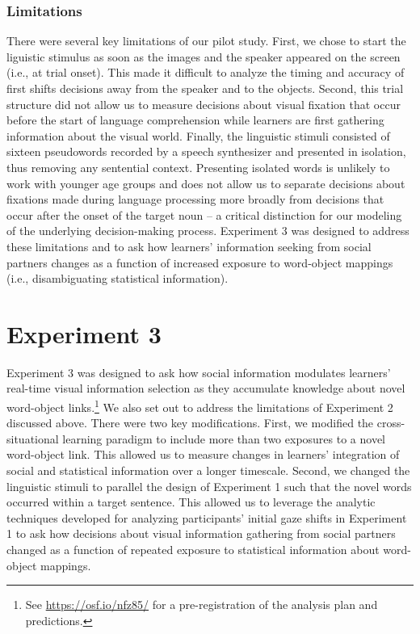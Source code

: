 \documentclass[man,floatsintext]{apa6}
\let\rmarkdownfootnote\footnote%
\def\footnote{\protect\rmarkdownfootnote}
\begin{document}
\subsubsection{Limitations}\label{limitations}

There were several key limitations of our pilot study. First, we chose
to start the liguistic stimulus as soon as the images and the speaker
appeared on the screen (i.e., at trial onset). This made it difficult to
analyze the timing and accuracy of first shifts decisions away from the
speaker and to the objects. Second, this trial structure did not allow
us to measure decisions about visual fixation that occur before the
start of language comprehension while learners are first gathering
information about the visual world. Finally, the linguistic stimuli
consisted of sixteen pseudowords recorded by a speech synthesizer and
presented in isolation, thus removing any sentential context. Presenting
isolated words is unlikely to work with younger age groups and does not
allow us to separate decisions about fixations made during language
processing more broadly from decisions that occur after the onset of the
target noun -- a critical distinction for our modeling of the underlying
decision-making process. Experiment 3 was designed to address these
limitations and to ask how learners' information seeking from social
partners changes as a function of increased exposure to word-object
mappings (i.e., disambiguating statistical information).

\section{Experiment 3}\label{experiment-3}

Experiment 3 was designed to ask how social information modulates
learners' real-time visual information selection as they accumulate
knowledge about novel word-object links.\footnote{See
  \url{https://osf.io/nfz85/} for a pre-registration of the analysis
  plan and predictions.} We also set out to address the limitations of
Experiment 2 discussed above. There were two key modifications. First,
we modified the cross-situational learning paradigm to include more than
two exposures to a novel word-object link. This allowed us to measure
changes in learners' integration of social and statistical information
over a longer timescale. Second, we changed the linguistic stimuli to
parallel the design of Experiment 1 such that the novel words occurred
within a target sentence. This allowed us to leverage the analytic
techniques developed for analyzing participants' initial gaze shifts in
Experiment 1 to ask how decisions about visual information gathering
from social partners changed as a function of repeated exposure to
statistical information about word-object mappings.
\end{document}
